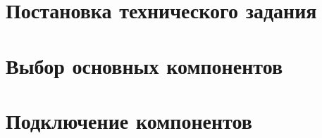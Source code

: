 \chapter{Постановка технического задания}



\chapter{Выбор основных компонентов}











\chapter{Подключение компонентов}


